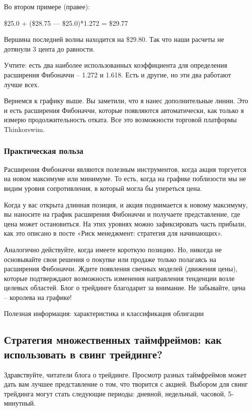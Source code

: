 \documentclass[a5paper]{article}
\begin{document}
Во втором примере (правее):

\$25.0 + (\$28.75 — \$25.0)*1.272 = \$29.77

Вершина последней волны находится на \$29.80. Так что наши расчеты не дотянули 3 цента до равности.

Учтите: есть два наиболее использованных коэффициента для определения расширения Фибоначчи – 1.272 и 1.618. Есть и другие, но эти два работают лучше всех.

Вернемся к графику выше. Вы заметили, что я нанес дополнительные линии. Это и есть расширения Фибоначчи, которые появляются автоматически, как только я измерю продолжительность отката. Все это возможности торговой платформы Thinkorswim.

\subsubsection{Практическая польза}

Расширения Фибоначчи являются полезным инструментов, когда акция торгуется на новом максимуме или минимуме. То есть, когда на графике поблизости мы не видим уровня сопротивления, в который могла бы упереться цена.

Когда у вас открыта длинная позиция, и акция поднимается к новому максимуму, вы наносите на график расширения Фибоначчи и получаете представление, где цена может остановиться. На этих уровнях можно зафиксировать часть прибыли, как это описано в посте «Риск менеджмент: стратегия для начинающих».

Аналогично действуйте, когда имеете короткую позицию. Но, никогда не основывайте свои решения о покупке или продаже только полагаясь на расширения Фибоначчи. Ждите появления свечных моделей (движения цены), которые подтверждают возможность изменения направления тенденции возле целевых областей. Блог о трейдинге благодарит за внимание. Не забывайте, цена – королева на графике!


Полезная информация: характеристика и классификация облигации

\subsection{Стратегия множественных таймфреймов: как использовать в
  свинг трейдинге?}

Здравствуйте, читатели блога о трейдинге. Просмотр разных таймфреймов может дать вам лучшее представление о том, что творится с акцией. Выбором для свинг трейдинга могут стать следующие периоды: дневной, недельный, часовой, 5-минутный.
\end{document}
